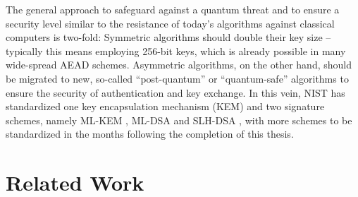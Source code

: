 The general approach to safeguard against a quantum threat and to ensure a security level similar to the resistance of today's algorithms against classical computers is two-fold:
Symmetric algorithms should double their key size -- typically this means employing 256-bit keys, which is already possible in many wide-spread AEAD schemes. Asymmetric algorithms, on the other hand, should be migrated to new, so-called ``post-quantum'' or ``quantum-safe'' algorithms to ensure the security of authentication and key exchange. In this vein, NIST has standardized \cite{nist-standardization} one key encapsulation mechanism (KEM) and two signature schemes, namely ML-KEM \cite{fips203}, ML-DSA \cite{fips204} and SLH-DSA \cite{fips205}, with more schemes to be standardized in the months following the completion of this thesis.

\section{Related Work} \label{sec:related-work}

